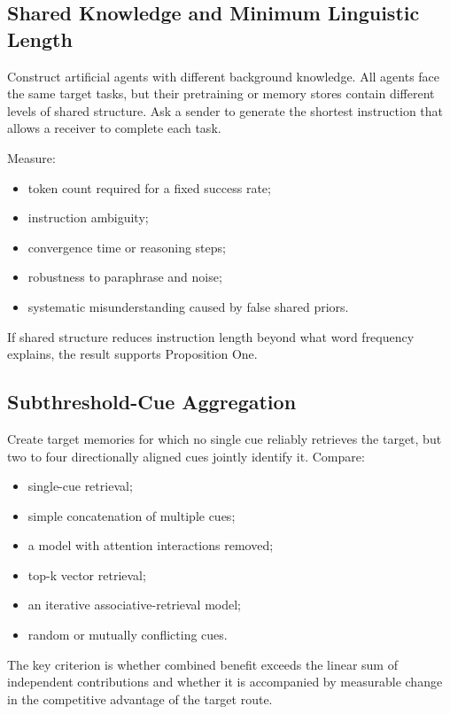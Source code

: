 \documentclass[11pt, a4paper]{article}
\begin{document}
\subsection{Shared Knowledge and Minimum Linguistic Length}


Construct artificial agents with different background knowledge. All agents face the same target tasks, but their pretraining or memory stores contain different levels of shared structure. Ask a sender to generate the shortest instruction that allows a receiver to complete each task.


Measure:


\begin{itemize}
\item token count required for a fixed success rate;
\item instruction ambiguity;
\item convergence time or reasoning steps;
\item robustness to paraphrase and noise;
\item systematic misunderstanding caused by false shared priors.
\end{itemize}


If shared structure reduces instruction length beyond what word frequency explains, the result supports Proposition One.


\subsection{Subthreshold-Cue Aggregation}


Create target memories for which no single cue reliably retrieves the target, but two to four directionally aligned cues jointly identify it. Compare:


\begin{itemize}
\item single-cue retrieval;
\item simple concatenation of multiple cues;
\item a model with attention interactions removed;
\item top-k vector retrieval;
\item an iterative associative-retrieval model;
\item random or mutually conflicting cues.
\end{itemize}


The key criterion is whether combined benefit exceeds the linear sum of independent contributions and whether it is accompanied by measurable change in the competitive advantage of the target route.
\end{document}
